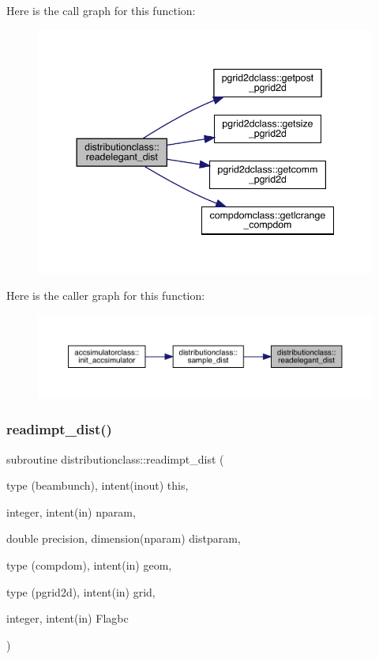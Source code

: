 Here is the call graph for this function\+:\nopagebreak
\begin{figure}[H]
\begin{center}
\leavevmode
\includegraphics[width=344pt]{namespacedistributionclass_acf080fd52aac8287d955bcfd88362c07_cgraph}
\end{center}
\end{figure}
Here is the caller graph for this function\+:\nopagebreak
\begin{figure}[H]
\begin{center}
\leavevmode
\includegraphics[width=350pt]{namespacedistributionclass_acf080fd52aac8287d955bcfd88362c07_icgraph}
\end{center}
\end{figure}
\mbox{\label{namespacedistributionclass_ab1d0719de2c779c9d5e8a5f353555193}} 
\subsubsection{\texorpdfstring{readimpt\_dist()}{readimpt\_dist()}}
{\footnotesize\ttfamily subroutine distributionclass\+::readimpt\+\_\+dist (\begin{DoxyParamCaption}\item[{type (beambunch), intent(inout)}]{this,  }\item[{integer, intent(in)}]{nparam,  }\item[{double precision, dimension(nparam)}]{distparam,  }\item[{type (compdom), intent(in)}]{geom,  }\item[{type (pgrid2d), intent(in)}]{grid,  }\item[{integer, intent(in)}]{Flagbc }\end{DoxyParamCaption})}



